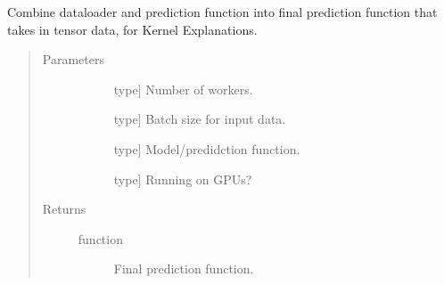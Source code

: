 \documentclass[letterpaper,10pt,english]{sphinxmanual}
\begin{document}
\begin{fulllineitems}
\label{\detokenize{index:methylnet.interpretation_classes.main_prediction_function}}
Combine dataloader and prediction function into final prediction function that takes in tensor data, for Kernel Explanations.
\begin{quote}\begin{description}
\item[{Parameters}] \leavevmode\begin{description}
\item[{}] \leavevmode{[}type{]}
Number of workers.

\item[{}] \leavevmode{[}type{]}
Batch size for input data.

\item[{}] \leavevmode{[}type{]}
Model/predidction function.

\item[{}] \leavevmode{[}type{]}
Running on GPUs?

\end{description}

\item[{Returns}] \leavevmode\begin{description}
\item[{function}] \leavevmode
Final prediction function.

\end{description}

\end{description}\end{quote}

\end{fulllineitems}

\end{document}
